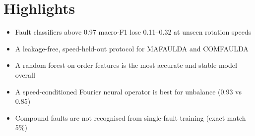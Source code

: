 \documentclass{article}
\begin{document}
\section*{Highlights}
\begin{itemize}
\item Fault classifiers above 0.97 macro-F1 lose 0.11--0.32 at unseen rotation speeds
\item A leakage-free, speed-held-out protocol for MAFAULDA and COMFAULDA
\item A random forest on order features is the most accurate and stable model overall
\item A speed-conditioned Fourier neural operator is best for unbalance (0.93 vs 0.85)
\item Compound faults are not recognised from single-fault training (exact match 5\%)
\end{itemize}
\end{document}
